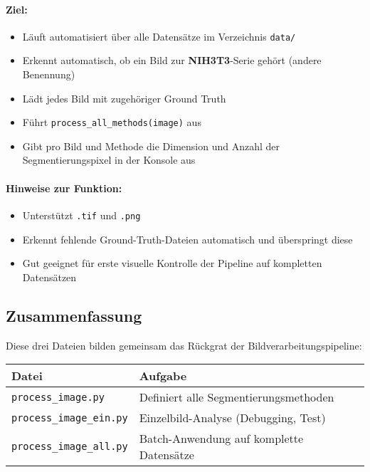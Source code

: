 \documentclass[a4paper,12pt]{article}
\begin{document}
\paragraph{Ziel:}
\begin{itemize}
  \item Läuft automatisiert über alle Datensätze im Verzeichnis \texttt{data/}
  \item Erkennt automatisch, ob ein Bild zur \textbf{NIH3T3}-Serie gehört (andere Benennung)
  \item Lädt jedes Bild mit zugehöriger Ground Truth
  \item Führt \texttt{process\_all\_methods(image)} aus
  \item Gibt pro Bild und Methode die Dimension und Anzahl der Segmentierungspixel in der Konsole aus
\end{itemize}

\paragraph{Hinweise zur Funktion:}
\begin{itemize}
  \item Unterstützt \texttt{.tif} und \texttt{.png}
  \item Erkennt fehlende Ground-Truth-Dateien automatisch und überspringt diese
  \item Gut geeignet für erste visuelle Kontrolle der Pipeline auf kompletten Datensätzen
\end{itemize}

\subsection*{ Zusammenfassung}

Diese drei Dateien bilden gemeinsam das Rückgrat der Bildverarbeitungspipeline:

\begin{center}
\begin{tabular}{|l|l|}
\hline
\textbf{Datei} & \textbf{Aufgabe} \\
\hline
\texttt{process\_image.py} & Definiert alle Segmentierungsmethoden \\
\texttt{process\_image\_ein.py} & Einzelbild-Analyse (Debugging, Test) \\
\texttt{process\_image\_all.py} & Batch-Anwendung auf komplette Datensätze \\
\hline
\end{tabular}
\end{center}
\end{document}
